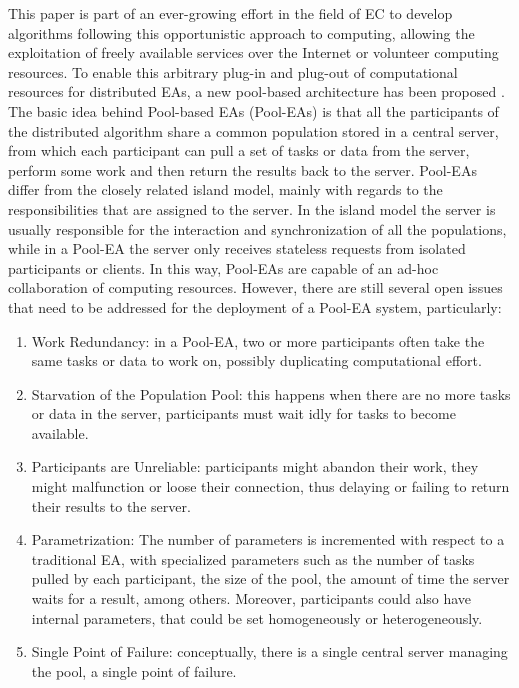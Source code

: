This paper is part of an ever-growing effort in the field of EC to develop algorithms following this opportunistic approach to computing, allowing the exploitation of freely available services over the Internet or volunteer computing resources. To enable this arbitrary plug-in and plug-out of computational resources for distributed EAs, a new pool-based architecture has been proposed \cite{sofea1,sofea2,sofea3,PoolvsIsland,Evospace,Musart,FreeLunch,Fire}.
The basic idea behind Pool-based EAs (Pool-EAs) is that all the participants of the distributed algorithm share a common population stored in a central server, from which each participant can pull a set of tasks or data from the server, perform some work and then return the results back to the server. Pool-EAs differ from the closely related island model, mainly with regards to the responsibilities that are assigned to the server.
In the island model the server is usually responsible for the interaction and synchronization of all the populations,
while in a Pool-EA the server only receives stateless requests from isolated participants or clients. 
In this way, Pool-EAs are capable of an ad-hoc collaboration of computing resources.
However, there are still several open issues that need to be addressed for the deployment of a Pool-EA system, particularly:
\begin{enumerate}
	\item Work Redundancy: in a Pool-EA, two or more participants often take the same tasks or data to work on, possibly duplicating
	computational effort.
	\item Starvation of the Population Pool: this happens when there are no more tasks or data in the server, participants must wait idly for tasks to become available.
	  
	
	\item Participants are Unreliable: participants might abandon their work, they might malfunction or loose their connection, thus delaying or failing to return their results to the server.
	\item Parametrization: The number of parameters is incremented with respect to a traditional EA, with specialized parameters such as the number of tasks pulled by each participant, the size of the pool, the amount of time the server waits for a result, among others. Moreover, participants could also have internal parameters, that could be set homogeneously or heterogeneously.
	\item Single Point of Failure: conceptually, there is a single central server managing the pool, a single point of failure.  	
\end{enumerate}

